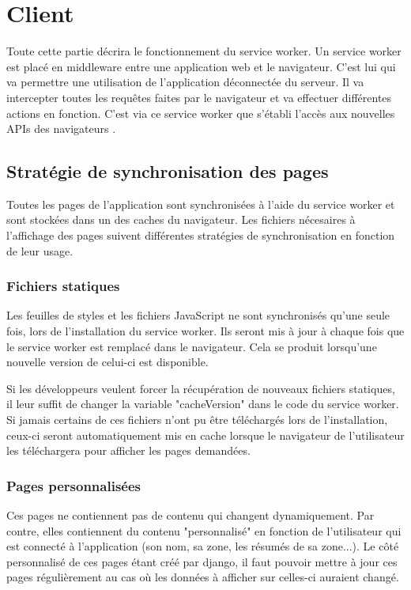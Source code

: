 \documentclass{EPL-master-thesis-covers-FR}
\begin{document}
				
		\section{Client}
			Toute cette partie décrira le fonctionnement du service worker. Un service worker est placé en middleware entre une application web et le navigateur. C'est lui qui va permettre une utilisation de l'application déconnectée du serveur. Il va intercepter toutes les requêtes faites par le navigateur et va effectuer différentes actions en fonction. C'est via ce service worker que s'établi l'accès aux nouvelles APIs des navigateurs \cite{ref:sw}.
			
			
			\subsection*{Stratégie de synchronisation des pages}			
				Toutes les pages de l'application sont synchronisées à l'aide du service worker et sont stockées dans un des caches du navigateur. Les fichiers nécesaires à l'affichage des pages suivent différentes stratégies de synchronisation en fonction de leur usage.			
				
				\subsubsection*{Fichiers statiques}  
					Les feuilles de styles et les fichiers JavaScript ne sont synchronisés qu'une seule fois, lors de l'installation du service worker. Ils seront mis à jour à chaque fois que le service worker est remplacé dans le navigateur. Cela se produit lorsqu'une nouvelle version de celui-ci est disponible. 
					
					Si les développeurs veulent forcer la récupération de nouveaux fichiers statiques, il leur suffit de changer la variable "cacheVersion" dans le code du service worker. Si jamais certains de ces fichiers n'ont pu être téléchargés lors de l'installation, ceux-ci seront automatiquement mis en cache lorsque le navigateur de l'utilisateur les téléchargera pour afficher les pages demandées.
					
					
				\subsubsection*{Pages personnalisées}				
				 	Ces pages ne contiennent pas de contenu qui changent dynamiquement. Par contre, elles contiennent du contenu "personnalisé" en fonction de l'utilisateur qui est connecté à l'application (son nom, sa zone, les résumés de sa zone...). Le côté personnalisé de ces pages étant créé par \Gls{django}, il faut pouvoir mettre à jour ces pages régulièrement au cas où les données à afficher sur celles-ci auraient changé. 
				 	
\end{document}
